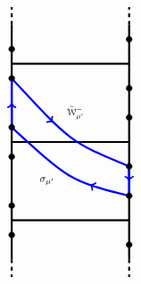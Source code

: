 \documentclass[11 pt]{article}
\renewcommand\({\left(}
\renewcommand\){\right)}
\newcommand\wt{\widetilde}
\newcommand\s{\sigma}
\newcommand\<{\langle}
\renewcommand\>{\rangle}
\newcommand\8{\infty}
\newcommand{\mc}{\mathcal}
\begin{document}
\begin{figure}[h]
\[
\begin{tikzpicture}[scale = 0.55]

\draw[ultra thick] (-13,-4) -- (-13, 8);
\draw[ultra thick] (-7,-4) -- (-7,8);

\draw[ultra thick, dashed] (-13,8) -- (-13,8.9);
\draw[ultra thick, dashed] (-7,8) -- (-7,8.9);
\draw[ultra thick, dashed] (-13,-4) -- (-13,-4.9);
\draw[ultra thick, dashed] (-7,-4) -- (-7,-4.9);

\draw[ultra thick] (-13,-2) -- (-7,-2);
\draw[ultra thick] (-13,2) -- (-7,2);
\draw[ultra thick] (-13,6) -- (-7,6);




\draw [ ultra thick, blue] (-13,5.25) .. controls (-10,2) .. (-7,.75);
\draw[ ->, ultra thick, blue] (-11,3.1) -- (-10.9, 3);

\draw [ultra thick, blue] (-13,2.75) .. controls (-10,0) .. (-7,-.75);
\draw[ <-, ultra thick, blue] (-9,-0.175) -- (-8.9, -.225);

\draw [ultra thick, blue] (-7, -.75) -- (-7, .75);
\draw [->,ultra thick, blue ](-7, .75) -- (-7, 0);

\draw [ultra thick, blue] (-13, 5.25) -- (-13, 2.75); 
\draw [->,ultra thick, blue ](-13, 2.75) -- (-13, 4);



\draw (-9.75,3.5) node [scale = .75] {$\wt{\mc{W}}^-_{\mu'}$};
\draw (-11.2,0) node [scale = .85] {$\s_{\mu'}$};



\node [scale = .50] [circle, draw, fill = black] at (-13,-1.25)  {};
\node [scale = .50] [circle, draw, fill = black] at (-13,1.25)  {};
\node [scale = .50] [circle, draw, fill = black] at (-7,-.75)  {};
\node [scale = .50] [circle, draw, fill = black] at (-7,.75)  {};

\node [scale = .50] [circle, draw, fill = black] at (-13,6.75)  {};
\node [scale = .50] [circle, draw, fill = black] at (-7,7.25)  {};



\node [scale = .50] [circle, draw, fill = black] at (-13,-2.75)  {};
\node [scale = .50] [circle, draw, fill = black] at (-7,-3.25)  {};

\node [scale = .50] [circle, draw, fill = black] at (-13,2.75)  {};
\node [scale = .50] [circle, draw, fill = black] at (-13,5.25)  {};
\node [scale = .50] [circle, draw, fill = black] at (-7,3.25)  {};
\node [scale = .50] [circle, draw, fill = black] at (-7,4.75)  {};



\end{tikzpicture}\]
\end{figure}
\end{document}
